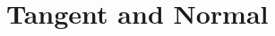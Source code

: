 \documentclass[11pt]{book}
\begin{document}
\section{ Tangent and Normal}

%

%
%
%
\latexprintindex
\end{document}
